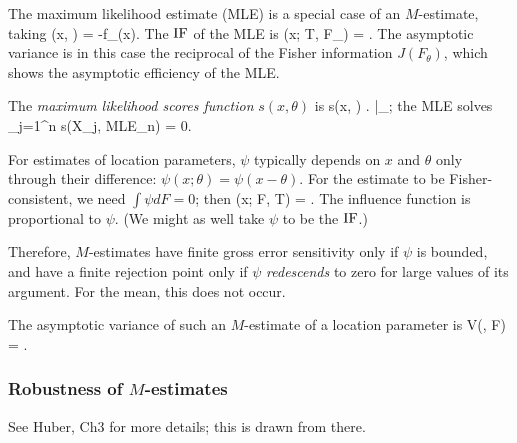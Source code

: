The maximum likelihood estimate (MLE) is a special case of an $M$-estimate,
taking
\beq
    \rho(x, \theta) = -\ln f_\theta(x).
\eeq
The ${\rm IF}$ of the MLE is
\beq
    \IF(x; T, F_\theta) =
    .
\eeq
The asymptotic variance is in this case the reciprocal of the Fisher information $J(F_\theta)$,
which shows the asymptotic efficiency of the MLE.

The {\em maximum likelihood scores function\/} $s(x, \theta)$ is
\beq
    s(x, \theta) \equiv \left .  \right |_{\theta};
\eeq
the MLE solves
\beq
    \sum_{j=1}^n s(X_j, \mbox{MLE}_n) = 0.
\eeq

For estimates of location parameters,  $\psi$ typically depends on $x$ and $\theta$
only through their difference:
$\psi(x; \theta) = \psi(x-\theta)$.
For the estimate to be Fisher-consistent, we need $\int \psi dF = 0$;
then
\beq
    \IF(x; F, T) = .
\eeq
The influence function is proportional to $\psi$.
(We might as well take $\psi$ to be the ${\rm IF}$.)

Therefore, $M$-estimates have finite gross error sensitivity only if
$\psi$ is bounded, and have a finite rejection point only if $\psi$
{\em redescends\/} to zero for large values of its argument.
For the mean, this does not occur.

The asymptotic variance of such an $M$-estimate of a location parameter is
\beq
    V(\psi, F) = .
\eeq


\subsubsection{Robustness of $M$-estimates}
See Huber, Ch3 for more details; this is drawn from there.

